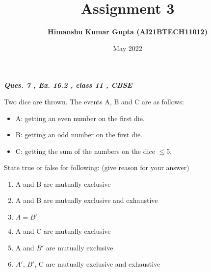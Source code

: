 \documentclass[journal,12pt,twocolumn]{IEEEtran}
\begin{document}
\newcommand{\myvec}[1]{\ensuremath{\begin{pmatrix}#1\end{pmatrix}}}
\let\vec\mathbf

\title{Assignment 3}
\author{\textbf{Himanshu Kumar Gupta (AI21BTECH11012)}}
\maketitle
\date {May 2022}

\textbf{\textit{Ques. 7 , Ex. 16.2 , class 11 , CBSE}}

Two dice are thrown. The events A, B and C are as follows:

\begin{itemize}
\item A: getting an even number on the first die.
\item B: getting an odd number on the first die.
\item C: getting the sum of the numbers on the dice $\leq5$.
\end{itemize}
 State true or false for following: (give reason for your answer)
 
 \begin{enumerate}
\item A and B are mutually exclusive
 
\item A and B are mutually exclusive and exhaustive

\item $A = B'$

\item A and C are mutually exclusive

\item A and $B'$ are mutually exclusive

\item $A'$, $B'$, C are mutually exclusive and exhaustive
\end{enumerate}
\end{document}
